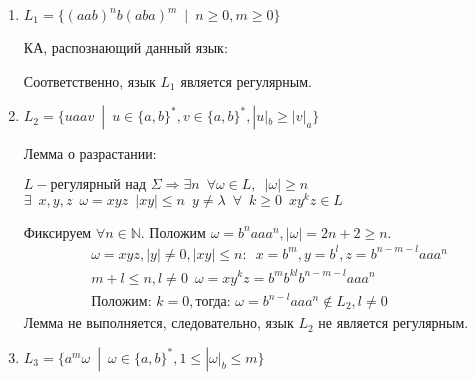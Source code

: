 \documentclass[a4paper, 12pt] {article} %
\begin{document}
\begin{enumerate}
    \item 
    $L_1 = \{(aab)^n b(aba)^m \enspace | \enspace n\ge 0, m\ge 0\}$
    
    КА, распознающий данный язык:
    \begin{center}
    \end{center}
    Соответственно, язык $L_1$ является регулярным. \\
    
    \item 
    $L_2 = \{uaav \enspace | \enspace u \in \{a,b\}^*, v \in \{a,b\}^*, |u|_b \ge |v|_a \}$
    
    Лемма о разрастании:
    \begin{center}
        $L - \text{регулярный над } \Sigma \Rightarrow \exists n \enspace \forall \omega \in L, \enspace |\omega| \ge n$ \\
        $\exists \enspace x,y,z \enspace \omega = xyz \enspace |xy| \le n \enspace y \ne \lambda \enspace \forall \enspace k \ge 0 \enspace xy^kz \in L$
    \end{center}
    
    Фиксируем $\forall n \in \mathbb{N}$. Положим $\omega = b^n aaa^n, |\omega| = 2n+2 \ge n$.
    \begin{align*}
        &\omega = xyz, |y| \ne 0, |xy| \le n : \enspace x = b^m, y = b^l, z = b^{n-m-l}aaa^n \\
        &m+l \le n, l \ne 0 \enspace \omega = xy^kz = b^{m}b^{kl}b^{n-m-l}aaa^n \\
        &\text{Положим: } k=0, \text{тогда: } \omega = b^{n-l}aaa^n \notin L_2, l \ne 0
    \end{align*}
    Лемма не выполняется, следовательно, язык $L_2$ не является регулярным. \\

    \item 
    $L_3 = \{a^m\omega \enspace | \enspace \omega \in \{a,b\}^*, 1 \le |\omega|_b \le m\}$
    

\end{enumerate}
\end{document}
